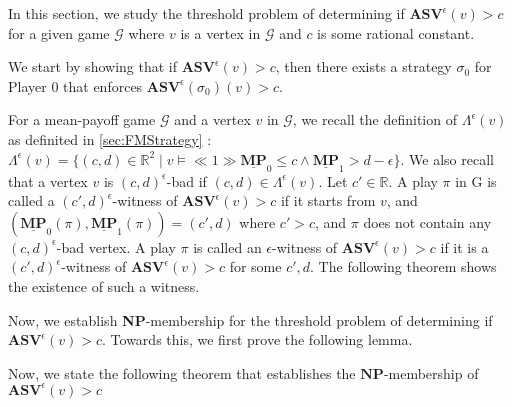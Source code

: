 In this section, we study the threshold problem of determining if $\mathbf{ASV}^{\epsilon}(v) > c$  for a given game $\mathcal{G}$ where $v$ is a vertex in $\mathcal{G}$ and $c$ is some rational constant.

We start by showing that if $\mathbf{ASV}^{\epsilon}(v) > c$, then there exists a strategy $\sigma_0$ for Player 0 that enforces $\mathbf{ASV}^{\epsilon}(\sigma_0)(v) > c$.



For a mean-payoff game $\mathcal{G}$ and a vertex $v$ in $\mathcal{G}$, we recall the definition of $\Lambda^{\epsilon}(v)$ as definited in \cref{sec:FMStrategy} : $\Lambda^{\epsilon}(v) = \{(c,d) \in \mathbb{R}^2 \mid v \models \ll 1 \gg \underline{\mathbf{MP}}_0 \leqslant c \land \underline{\mathbf{MP}}_1 > d-\epsilon \}$. We also recall that a vertex $v$ is $(c,d)^{\epsilon}$-bad if $(c,d) \in \Lambda^{\epsilon}(v)$. Let $c' \in \mathbb{R}$. A play $\pi$ in G is called a $(c',d)^{\epsilon}$-witness of $\mathbf{ASV}^{\epsilon}(v) > c$ if it starts from $v$, and $(\underline{\mathbf{MP}}_0(\pi), \underline{\mathbf{MP}}_1(\pi)) = (c', d)$ where $c' > c$, and $\pi$ does not contain any $(c,d)^{\epsilon}$-bad vertex. A play $\pi$ is called an $\epsilon$-witness of $\mathbf{ASV}^{\epsilon}(v) > c$ if it is a $(c',d)^{\epsilon}$-witness of $\mathbf{ASV}^{\epsilon}(v) > c$ for some $c',d$. 
The following theorem shows the existence of such a witness.



Now, we establish \textbf{NP}-membership for the threshold problem of determining if $\mathbf{ASV}^{\epsilon}(v) > c$. Towards this, we first prove the following lemma.



Now, we state the following theorem that establishes the $\mathbf{NP}$-membership of $\mathbf{ASV}^{\epsilon}(v) > c$
